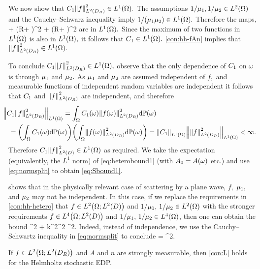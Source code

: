 We now show that $\Co\NLtDR{f}^2 \in \LoO.$ The assumptions $1/\muo,1/\mut \in \LtO$ and the Cauchy--Schwarz inequality imply $1/(\muo\mut) \in \LoO.$ Therefore the maps,
\beqs\omega \mapsto {} + \left(R+ \right)^2  \omega \mapsto {} + \left(R+ \right)^2
\eeqs
are in $\LoO.$ Since the maximum of two functions in $\LoO$ is also in $\LoO,$ it follows that $\Co \in \LoO.$ \cref{con:hh-fAn} implies that $\NLtDR{f}^2 \in \LoO.$

To conclude $\Co\NLtDR{f}^2 \in \LoO,$ observe that the only dependence of $C_{1}$ on $\omega$ is through $\mu_{1}$ and $\mu_{2}.$ As $\mu_{1}$ and $\mu_{2}$ are assumed independent of $f,$ and measurable functions of independent random variables are independent \cite[p.236]{Lo:77} it follows that $C_{1}$ and $\NLtDR{f}^2$ are independent, and therefore
\begin{align}\nonumber
&\hspace{-2ex}\NLoO{\Co\NLtDR{f}^2} = \int_\Omega \Co(\omega) \NLtDR{f(\omega)}^2 \dd\PP(\omega) 
\\ &= \mleft(\int_\Omega \Co(\omega) \dd\PP(\omega)\mright)\mleft(\int_\Omega \NLtDR{f(\omega)}^2 \dd\PP(\omega)\mright)= \NLoO{\Co}\NLoO{\NLtDR{f}^2} < \infty.\label{eq:normsplit}
\end{align}
Therefore $\Co\NLtD{f}^2 \in \LoO$ as required. We take the expectation (equivalently, the $L^1$ norm) of \eqref{eq:heterobound1} (with $A_{0} = A(\omega)$ etc.) and use \eqref{eq:normsplit} to obtain \eqref{eq:Sbound1}.
\epf

\label{rem:notindep}
 shows that in the physically relevant case of scattering by a plane wave, $f,$ $\mu_{1},$ and $\mu_{2}$ may not be independent. In this case, if we replace the requirements in \cref{con:hh-hetero} that $f \in \LtOLtD$ and $1/\muo,\,1/\mut \in \LtO$ with the stronger requirements $f \in \LfOLtD$ and $1/\muo,\,1/\mut \in \LfO$, then one can obtain the bound
\beqs
{}^2 + k^2^2\leq \NLtO{\Co} ^2.
\eeqs
Indeed, instead of independence, we use the Cauchy--Schwartz inequality in \eqref{eq:normsplit} to conclude
\beqs
{}  \leq \NLtO{\Co} = \NLtO{\Co} ^2.
\eeqs
\ere

\label{lem:hh-L}
If $f \in \LtOLtDR$ and $A$ and $n$ are strongly measurable, then \cref{con:L} holds for the Helmholtz stochastic EDP.
\ele

